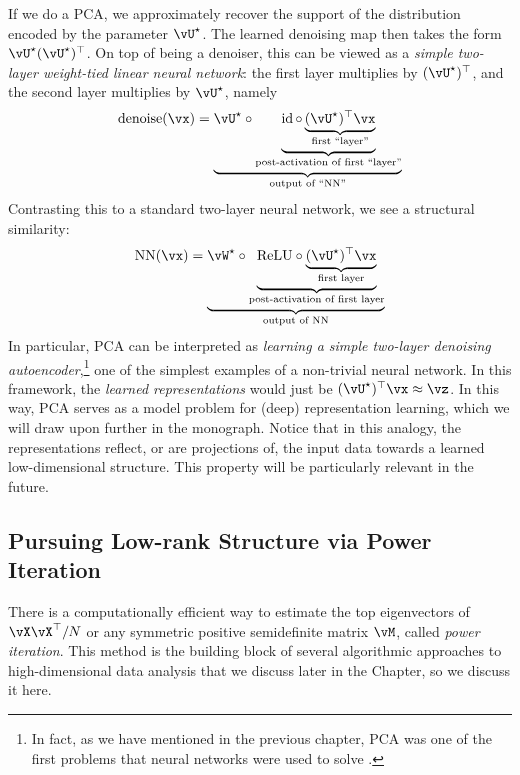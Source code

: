\documentclass[\toplevelprefix/book-main.tex]{subfiles}
\begin{document}
\begin{remark}
    If we do a PCA, we approximately recover the support of the distribution
    encoded by the parameter \(\vU^{\star}\). The learned denoising map then
    takes the form \(\vU^{\star}(\vU^{\star})^{\top}\). On top of being
    a denoiser, this can be viewed as a \textit{simple two-layer weight-tied
    linear neural network}: the first layer multiplies by
    \((\vU^{\star})^{\top}\), and the second layer multiplies by \(\vU^{\star}\), namely
    \begin{equation}
        \operatorname{denoise}(\vx) = \underbrace{\vU^{\star} \circ
        \underbrace{\id \circ \underbrace{(\vU^{\star})^{\top}\vx}_{\text{first ``layer''}}}_{\text{post-activation of first ``layer''}}}_{\text{output of ``NN''}}
    \end{equation}
    Contrasting this to a standard two-layer neural network, we see a structural similarity:
    \begin{equation}
        \operatorname{NN}(\vx) = \underbrace{\vW^{\star} \circ
        \underbrace{\mathrm{ReLU} \circ \underbrace{(\vU^{\star})^{\top}\vx}_{\text{first layer}}}_{\text{post-activation of first layer}}}_{\text{output of NN}}
    \end{equation}
    In particular, PCA can be interpreted as \textit{learning a simple two-layer
    denoising autoencoder},\footnote{In fact, as we have mentioned in the
    previous chapter, PCA was one of the first problems that neural networks
    were used to solve \cite{Oja1982SimplifiedNM,Baldi89}.} one of the simplest
    examples of a non-trivial neural network. In this framework, the
    \textit{learned representations} would just be \((\vU^{\star})^{\top}\vx \approx \vz\). In this way, PCA serves as a model problem for (deep) representation learning, which we will draw upon further in the monograph. Notice that in this analogy, the representations reflect, or are projections of, the input data towards a learned low-dimensional structure. This property will be particularly relevant in the future.
\end{remark}

\subsection{Pursuing Low-rank Structure via Power Iteration}\label{subsec:power iterations}

There is a computationally efficient way to estimate the top eigenvectors of \(\vX\vX^{\top}/N\) or any symmetric positive semidefinite matrix \(\vM\), called \textit{power iteration}. This method is the building block of several algorithmic approaches to high-dimensional data analysis that we discuss later in the Chapter, so we discuss it here. 
\end{document}
